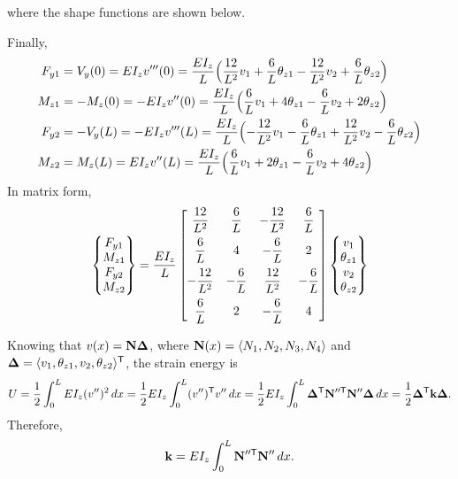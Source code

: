 where the shape functions are shown below.
\begin{fig}
  
\end{fig}
Finally,
\begin{align}
  F_{y1} &= V_y(0) = EI_z v'''(0) = \frac{EI_z}{L}\Bigl(\frac{12}{L^2}v_1 + \frac6L\theta_{z1} - \frac{12}{L^2}v_2 + \frac6L\theta_{z2}\Bigr)\\
  M_{z1} &= -M_z(0) = -EI_z v''(0) = \frac{EI_z}{L}\Bigl(\frac6L v_1 + 4\theta_{z1} - \frac6L v_2 + 2\theta_{z2}\Bigr)\\
  F_{y2} &= -V_y(L) = -EI_z v'''(L) = \frac{EI_z}{L}\Bigl(-\frac{12}{L^2}v_1 - \frac6L\theta_{z1} + \frac{12}{L^2}v_2 - \frac6L\theta_{z2}\Bigr)\\
  M_{z2} &= M_z(L) = EI_z v''(L) = \frac{EI_z}{L}\Bigl(\frac6L v_1 + 2\theta_{z1} - \frac6L v_2 + 4\theta_{z2}\Bigr)
\end{align}
In matrix form,
\begin{equation}
  \begin{Bmatrix}F_{y1}\\ M_{z1}\\ F_{y2}\\ M_{z2}\end{Bmatrix} = \frac{EI_z}{L}
  \begin{bmatrix}
    \dfrac{12}{L^2} & \dfrac6L & -\dfrac{12}{L^2} & \dfrac6L\\[8pt]
    \dfrac6L & 4 & -\dfrac6L & 2\\[8pt]
    -\dfrac{12}{L^2} & -\dfrac6L & \dfrac{12}{L^2} & -\dfrac6L\\[8pt]
    \dfrac6L & 2 & -\dfrac6L & 4
  \end{bmatrix}
  \begin{Bmatrix}v_1\\ \theta_{z1}\\ v_2\\ \theta_{z2}\end{Bmatrix}
\end{equation}

Knowing that $v(x) = \mathbf{N}\bm{\Delta}$, where $\mathbf{N}(x) = \langle N_1, N_2, N_3, N_4\rangle$ and $\bm{\Delta} = \langle v_1, \theta_{z1}, v_2, \theta_{z2}\rangle^{\mathsf{T}}$, the strain energy is
\begin{equation}
  U = \frac12\int_0^L EI_z(v'')^2\,dx = \frac12 EI_z\int_0^L (v'')^{\mathsf{T}} v''\,dx
    = \frac12 EI_z\int_0^L \bm{\Delta}^{\mathsf{T}}\mathbf{N}''^{\mathsf{T}}\mathbf{N}''\bm{\Delta}\,dx = \frac12\bm{\Delta}^{\mathsf{T}}\mathbf{k}\bm{\Delta}.
\end{equation}
Therefore,
\begin{equation}
  \mathbf{k} = EI_z\int_0^L \mathbf{N}''^{\mathsf{T}}\mathbf{N}''\,dx.
\end{equation}

